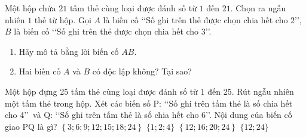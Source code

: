 \begin{bt}%

	Một hộp chứa $21$ tấm thẻ cùng loại được đánh số từ $1$ đến $21$. Chọn ra ngẫu nhiên $1$ thẻ từ hộp. Gọi $A$ là biến cố \lq\lq Số ghi trên thẻ được chọn chia hết cho $2$\rq\rq, $B$ là biến cố \lq\lq Số ghi trên thẻ được chọn chia hết cho $3$\rq\rq.
	\begin{enumerate}
		\item [a)] Hãy mô tả bằng lời biến cố $A B$.
		\item [b)] Hai biến cố $A$ và $B$ có độc lập không? Tại sao?
	\end{enumerate}
\end{bt}

\begin{ex}%
	Một hộp đựng 25 tấm thẻ cùng loại được đánh số từ 1 đến 25. Rút ngẫu nhiên một tấm thẻ trong hộp. Xét các biến số P: \lq\lq Số ghi  trên tấm thẻ là số chia hết cho 4\rq\rq \, và Q: \lq\lq Số ghi trên tấm thẻ là số chia hết cho 6\rq\rq. Nội dung của biến cố giao PQ là gì?
	\choice 
		 {$\left\{3;6;9;12;15;18;24\right\}$}
		 {$\{1;2;4\}$}
		 {$\left\{12;16;20;24\right\}$}
		 {\True $\{12;24\}$}
\end{ex}

